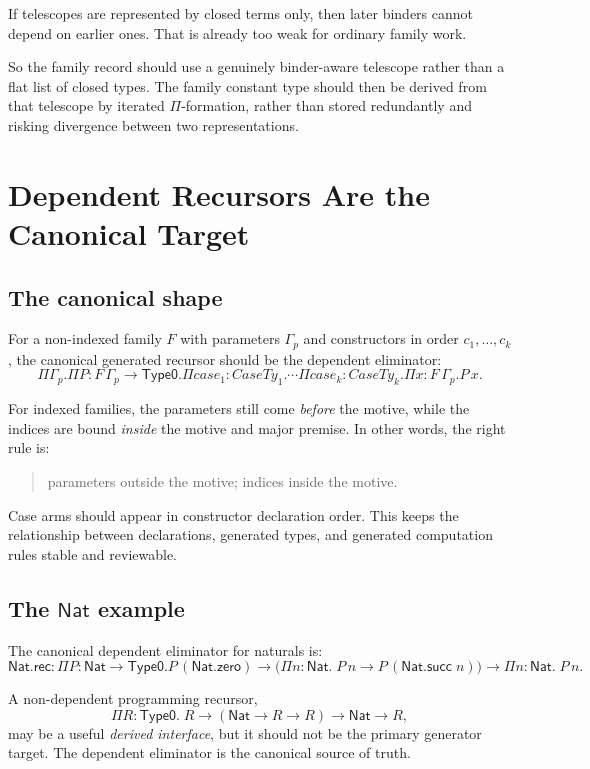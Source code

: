 \documentclass[11pt]{article}
\newcommand{\TypeZero}{\ensuremath{\mathsf{Type0}}}
\newcommand{\Nat}{\ensuremath{\mathsf{Nat}}}
\begin{document}
If telescopes are represented by closed terms only, then later binders cannot
depend on earlier ones. That is already too weak for ordinary family work.

So the family record should use a genuinely binder-aware telescope rather than a
flat list of closed types. The family constant type should then be derived from
that telescope by iterated $\Pi$-formation, rather than stored redundantly and
risking divergence between two representations.

\section{Dependent Recursors Are the Canonical Target}

\subsection{The canonical shape}

For a non-indexed family $F$ with parameters $\Gamma_p$ and constructors in
order $c_1,\dots,c_k$, the canonical generated recursor should be the dependent
eliminator:
\[
\Pi \Gamma_p.
\Pi P : F\,\Gamma_p \to \TypeZero.
\Pi \mathit{case}_1 : \mathit{CaseTy}_1.
\cdots
\Pi \mathit{case}_k : \mathit{CaseTy}_k.
\Pi x : F\,\Gamma_p.
P\,x.
\]

For indexed families, the parameters still come \emph{before} the motive, while
the indices are bound \emph{inside} the motive and major premise. In other
words, the right rule is:
\begin{quote}
parameters outside the motive; indices inside the motive.
\end{quote}

Case arms should appear in constructor declaration order. This keeps the
relationship between declarations, generated types, and generated computation
rules stable and reviewable.

\subsection{The \Nat{} example}

The canonical dependent eliminator for naturals is:
\[
\Nat.\mathsf{rec} :
\Pi P : \Nat \to \TypeZero.
P\,(\Nat.\mathsf{zero}) \to
\bigl(\Pi n : \Nat.\; P\,n \to P\,(\Nat.\mathsf{succ}\;n)\bigr) \to
\Pi n : \Nat.\; P\,n.
\]

A non-dependent programming recursor,
\[
\Pi R : \TypeZero.\; R \to (\Nat \to R \to R) \to \Nat \to R,
\]
may be a useful \emph{derived interface}, but it should not be the primary
generator target. The dependent eliminator is the canonical source of truth.
\end{document}
